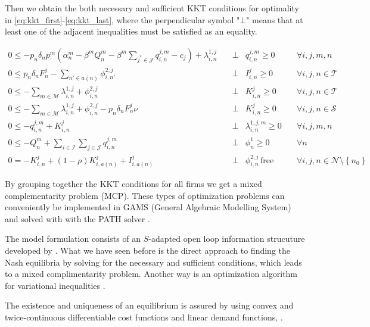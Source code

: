 Then we obtain the both necessary and sufficient KKT conditions for optimality in \eqref{eq:kkt_first}-\eqref{eq:kkt_last}, where the perpendicular symbol "$\bot$" means that at least one of the adjacent inequalities must be satisfied as an equality.


\begin{align}
0\leq - p_n\delta_np^m\left(\alpha_n^m-\beta^m Q_n^m-\beta^m\sum_{j^*\in \mathcal{J}}q_{i,n}^{j,m}-c_j\right)+\lambda_{i,n}^{1,j} &\quad\bot&q_{i,n}^{j,m}\geq 0&  \quad \forall i,j,m,n\label{eq:kkt_first}\\
0\leq p_n\delta_nF_n^{j} - \sum_{n'\in a(n)}\phi_{i,n'}^{2,j} &\quad\bot&I_{i,n}^{j}\geq 0&  \quad \forall i,j,n\in\mathcal{T}\\
0 \leq -\sum_{m\in\mathcal{M}}\lambda_{i,n}^{1,j}  +\phi_{i,n}^{2,j} &\quad\bot&K_{i,n}^{j}\geq 0&  \quad \forall i,j,n\in\mathcal{T}\\
0 \leq -\sum_{m\in\mathcal{M}}\lambda_{i,n}^{1,j}  +\phi_{i,n}^{2,j}-p_n\delta_nF_n^j\nu &\quad\bot&K_{i,n}^{j}\geq 0&  \quad \forall i,j,n\in\mathcal{S}\\
0\leq -q_{i,n}^{j,m} + K_{i,n}^{j} &\quad\bot&\lambda_{i,n}^{1,j,m}\geq 0&  \quad \forall i,j,m,n\\
0 \leq -Q_n^m+\sum_{i\in \mathcal{I}}\sum_{j\in \mathcal{J}} q_{i,n}^{j,m} &\quad\bot&\phi_{n}^{1}\geq 0&  \quad \forall n\\
0 = -K_{i,n}^{j} + (1-\rho)K_{i,a(n)}^{j}+I_{i,a(n)}^{j} &\quad\bot&\phi_{i,n}^{2,j}\,\mbox{free}  & \quad \forall i,j,n\in\mathcal{N}\setminus \left\{n_0\right\}\label{eq:kkt_last}
\end{align}

By grouping together the KKT conditions for all firms we get a mixed complementarity problem (MCP). These types of optimization problems can conveniently be implemented in GAMS (General Algebraic Modelling System) and solved with with the PATH solver \citep[see][]{Ferris2000}.

The model formulation consists of an $S$-adapted open loop information strucuture developed by \cite{Haurie1990}. What we have seen before is the direct approach to finding the Nash equilibria by solving for the necessary and sufficient conditions, which leads to a mixed complimentarity problem. Another way is an optimization algorithm for variational inequalities \citep[see e.g.][]{Haurie2002, Pineau2003}.

The existence and uniqueness of an equilibrium is assured by using convex and twice-continuous differentiable cost functions and linear demand functions, \citep[see e.g.][]{Murphy1982}. 


